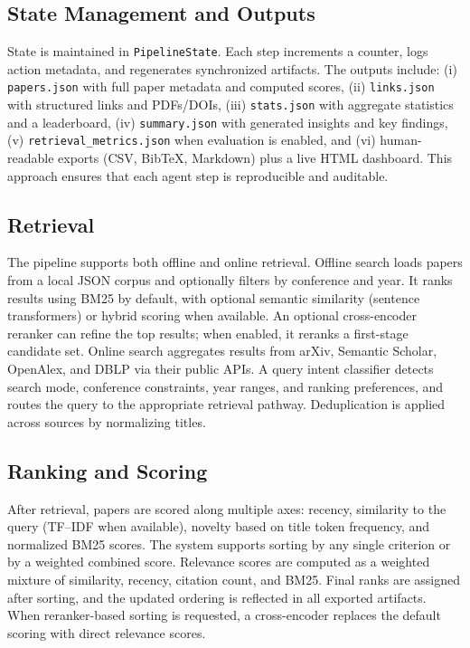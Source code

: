\subsection{State Management and Outputs}
State is maintained in \texttt{PipelineState}. Each step increments a counter, logs action metadata, and regenerates synchronized artifacts. The outputs include: (i) \texttt{papers.json} with full paper metadata and computed scores, (ii) \texttt{links.json} with structured links and PDFs/DOIs, (iii) \texttt{stats.json} with aggregate statistics and a leaderboard, (iv) \texttt{summary.json} with generated insights and key findings, (v) \texttt{retrieval\_metrics.json} when evaluation is enabled, and (vi) human-readable exports (CSV, BibTeX, Markdown) plus a live HTML dashboard. This approach ensures that each agent step is reproducible and auditable.

\subsection{Retrieval}
The pipeline supports both offline and online retrieval. Offline search loads papers from a local JSON corpus and optionally filters by conference and year. It ranks results using BM25 by default, with optional semantic similarity (sentence transformers) or hybrid scoring when available. An optional cross-encoder reranker can refine the top results; when enabled, it reranks a first-stage candidate set. Online search aggregates results from arXiv, Semantic Scholar, OpenAlex, and DBLP via their public APIs. A query intent classifier detects search mode, conference constraints, year ranges, and ranking preferences, and routes the query to the appropriate retrieval pathway. Deduplication is applied across sources by normalizing titles.

\subsection{Ranking and Scoring}
After retrieval, papers are scored along multiple axes: recency, similarity to the query (TF--IDF when available), novelty based on title token frequency, and normalized BM25 scores. The system supports sorting by any single criterion or by a weighted combined score. Relevance scores are computed as a weighted mixture of similarity, recency, citation count, and BM25. Final ranks are assigned after sorting, and the updated ordering is reflected in all exported artifacts. When reranker-based sorting is requested, a cross-encoder replaces the default scoring with direct relevance scores.

